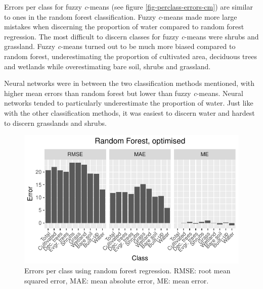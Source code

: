 \documentclass[a4paper,10pt]{book}
\begin{document}
Errors per class for fuzzy \textit{c}-means (see figure \ref{fig-perclass-errors-cm}) are similar to ones in the random forest classification. Fuzzy \textit{c}-means made more large mistakes when discerning the proportion of water compared to random forest regression. The most difficult to discern classes for fuzzy \textit{c}-means were shrubs and grassland. Fuzzy \textit{c}-means turned out to be much more biased compared to random forest, underestimating the proportion of cultivated area, deciduous trees and wetlands while overestimating bare soil, shrubs and grassland.

Neural networks were in between the two classification methods mentioned, with higher mean errors than random forest but lower than fuzzy \textit{c}-means. Neural networks tended to particularly underestimate the proportion of water. Just like with the other classification methods, it was easiest to discern water and hardest to discern grasslands and shrubs.

\begin{figure}
  \centering
  \includegraphics[width=\textwidth]{../plot/perclass-errors-rf}
  \caption{Errors per class using random forest regression. RMSE: root mean squared error, MAE: mean absolute error, ME: mean error.}
  \label{fig-perclass-errors-rf}
\end{figure}
\end{document}
